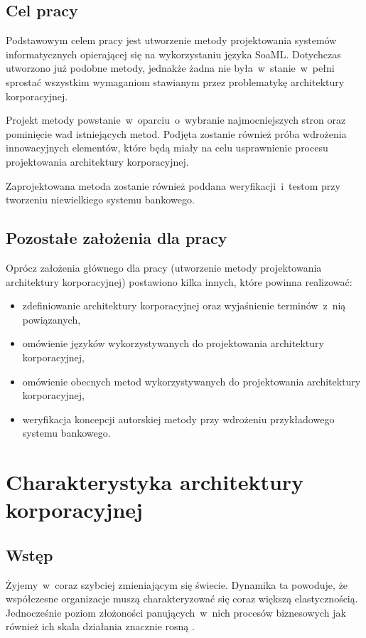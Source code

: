 \section{Cel pracy}
Podstawowym celem pracy jest utworzenie metody projektowania systemów informatycznych opierającej się na wykorzystaniu języka SoaML. Dotychczas utworzono już podobne metody, jednakże żadna nie była~w~stanie~w~pełni sprostać wszystkim wymaganiom stawianym przez problematykę architektury korporacyjnej.

Projekt metody powstanie~w~oparciu~o~wybranie najmocniejszych stron oraz pominięcie wad istniejących metod. Podjęta zostanie również próba wdrożenia innowacyjnych elementów, które będą miały na celu usprawnienie procesu projektowania architektury korporacyjnej.

Zaprojektowana metoda zostanie również poddana weryfikacji~i~testom przy tworzeniu niewielkiego systemu bankowego.

\section{Pozostałe założenia dla pracy}
Oprócz założenia głównego dla pracy (utworzenie metody projektowania architektury korporacyjnej) postawiono kilka innych, które powinna realizować:
\begin{itemize}
\item{zdefiniowanie architektury korporacyjnej oraz wyjaśnienie terminów~z~nią powiązanych,}
\item{omówienie języków wykorzystywanych do projektowania architektury korporacyjnej,}
\item{omówienie obecnych metod wykorzystywanych do projektowania architektury korporacyjnej,}
\item{weryfikacja koncepcji autorskiej metody przy wdrożeniu przykładowego systemu bankowego.}
\end{itemize}

\chapter{Charakterystyka architektury korporacyjnej}

\section{Wstęp}
Żyjemy~w~coraz szybciej zmieniającym się świecie. Dynamika ta powoduje, że współczesne organizacje muszą charakteryzować się coraz większą elastycznością. Jednocześnie poziom złożoności panujących~w~nich procesów biznesowych jak również ich skala działania znacznie rosną \cite{SobArchKorpDobrPr}.

